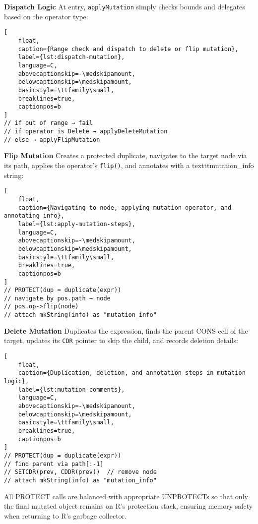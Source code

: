 \medskip
\noindent\textbf{Dispatch Logic}  
At entry, \texttt{applyMutation} simply checks bounds and delegates based on the operator type:

\begin{lstlisting}[
    float,
    caption={Range check and dispatch to delete or flip mutation},
    label={lst:dispatch-mutation},
    language=C,
    abovecaptionskip=-\medskipamount,
    belowcaptionskip=\medskipamount,
    basicstyle=\ttfamily\small,
    breaklines=true,
    captionpos=b
]
// if out of range → fail
// if operator is Delete → applyDeleteMutation
// else → applyFlipMutation
\end{lstlisting}


\medskip
\noindent\textbf{Flip Mutation}  
Creates a protected duplicate, navigates to the target node via its path, applies the operator’s \texttt{flip()}, and annotates with a texttt{mutation_info} string:

\begin{lstlisting}[
    float,
    caption={Navigating to node, applying mutation operator, and annotating info},
    label={lst:apply-mutation-steps},
    language=C,
    abovecaptionskip=-\medskipamount,
    belowcaptionskip=\medskipamount,
    basicstyle=\ttfamily\small,
    breaklines=true,
    captionpos=b
]
// PROTECT(dup = duplicate(expr))
// navigate by pos.path → node
// pos.op->flip(node)
// attach mkString(info) as "mutation_info"
\end{lstlisting}


\medskip
\noindent\textbf{Delete Mutation}  
Duplicates the expression, finds the parent CONS cell of the target, updates its \texttt{CDR} pointer to skip the child, and records deletion details:

\begin{lstlisting}[
    float,
    caption={Duplication, deletion, and annotation steps in mutation logic},
    label={lst:mutation-comments},
    language=C,
    abovecaptionskip=-\medskipamount,
    belowcaptionskip=\medskipamount,
    basicstyle=\ttfamily\small,
    breaklines=true,
    captionpos=b
]
// PROTECT(dup = duplicate(expr))
// find parent via path[:-1]
// SETCDR(prev, CDDR(prev))  // remove node
// attach mkString(info) as "mutation_info"
\end{lstlisting}


All PROTECT calls are balanced with appropriate UNPROTECTs so that only the final mutated object remains on R’s protection stack, ensuring memory safety when returning to R’s garbage collector.  


